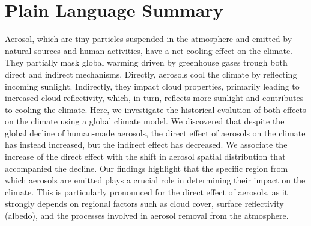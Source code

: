 \documentclass[draft]{agujournal2019}
\begin{document}
\section*{Plain Language Summary}
Aerosol, which are tiny particles suspended in the atmosphere and emitted by natural sources and human activities, have a net cooling effect on the climate. They partially mask global warming driven by greenhouse gases trough both direct and indirect mechanisms. Directly, aerosols cool the climate by reflecting incoming sunlight. Indirectly, they impact cloud properties, primarily leading to increased cloud reflectivity, which, in turn, reflects more sunlight and contributes to cooling the climate. Here, we investigate the historical evolution of both effects on the climate using a global climate model. We discovered that despite the global decline of human-made aerosols, the direct effect of aerosols on the climate has instead increased, but the indirect effect has decreased. We associate the increase of the direct effect with the shift in aerosol spatial distribution that accompanied the decline. Our findings highlight that the specific region from which aerosols are emitted plays a crucial role in determining their impact on the climate. This is particularly pronounced for the direct effect of aerosols, as it strongly depends on regional factors such as cloud cover, surface reflectivity (albedo), and the processes involved in aerosol removal from the atmosphere.



%
%

%

\end{document}
